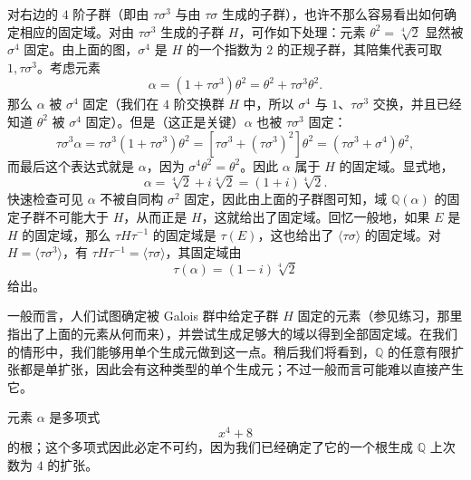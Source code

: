 对右边的 $4$ 阶子群（即由 $\tau\sigma^3$ 与由 $\tau\sigma$ 生成的子群），也许不那么容易看出如何确定相应的固定域。对由 $\tau\sigma^3$ 生成的子群 $H$，可作如下处理：元素 $\theta^2=\sqrt[4]{2}$ 显然被 $\sigma^4$ 固定。由上面的图，$\sigma^4$ 是 $H$ 的一个指数为 $2$ 的正规子群，其陪集代表可取 $1,\tau\sigma^3$。考虑元素
\[
\alpha=(1+\tau\sigma^3)\theta^2=\theta^2+\tau\sigma^3\theta^2.
\]
那么 $\alpha$ 被 $\sigma^4$ 固定（我们在 $4$ 阶交换群 $H$ 中，所以 $\sigma^4$ 与 $1$、$\tau\sigma^3$ 交换，并且已经知道 $\theta^2$ 被 $\sigma^4$ 固定）。但是（这正是关键）$\alpha$ 也被 $\tau\sigma^3$ 固定：
\[
\tau\sigma^3\alpha=\tau\sigma^3(1+\tau\sigma^3)\theta^2=[\tau\sigma^3+(\tau\sigma^3)^2]\theta^2
=(\tau\sigma^3+\sigma^4)\theta^2,
\]
而最后这个表达式就是 $\alpha$，因为 $\sigma^4\theta^2=\theta^2$。因此 $\alpha$ 属于 $H$ 的固定域。显式地，
\[
\alpha=\sqrt[4]{2}+i\sqrt[4]{2}=(1+i)\sqrt[4]{2}.
\]
快速检查可见 $\alpha$ 不被自同构 $\sigma^2$ 固定，因此由上面的子群图可知，域 $\mathbb Q(\alpha)$ 的固定子群不可能大于 $H$，从而正是 $H$，这就给出了固定域。回忆一般地，如果 $E$ 是 $H$ 的固定域，那么 $\tau H\tau^{-1}$ 的固定域是 $\tau(E)$，这也给出了 $\langle\tau\sigma\rangle$ 的固定域。对 $H=\langle\tau\sigma^3\rangle$，有 $\tau H\tau^{-1}=\langle\tau\sigma\rangle$，其固定域由
\[
\tau(\alpha)=(1-i)\sqrt[4]{2}
\]
给出。

一般而言，人们试图确定被 Galois 群中给定子群 $H$ 固定的元素（参见练习，那里指出了上面的元素从何而来），并尝试生成足够大的域以得到全部固定域。在我们的情形中，我们能够用单个生成元做到这一点。稍后我们将看到，$\mathbb Q$ 的任意有限扩张都是单扩张，因此会有这种类型的单个生成元；不过一般而言可能难以直接产生它。

元素 $\alpha$ 是多项式
\[
x^4+8
\]
的根；这个多项式因此必定不可约，因为我们已经确定了它的一个根生成 $\mathbb Q$ 上次数为 $4$ 的扩张。

